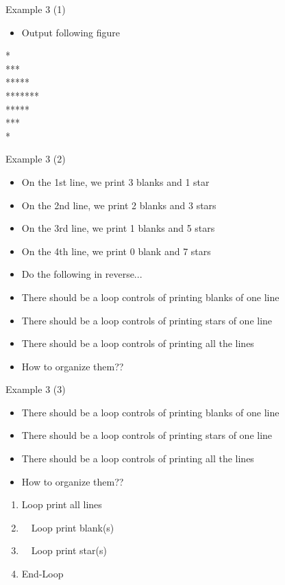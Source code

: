 \begin{frame}[fragile]{Example 3 (1)}
\begin{itemize}
	\item {Output following figure}
\end{itemize}
\begin{center}
\Large{
    * \\
   ***\\
  *****\\
 *******\\
  *****\\
   ***\\
    *
}
\end{center}
\end{frame}

\begin{frame}[fragile]{Example 3 (2)}
\begin{itemize}
	\item {On the 1st line, we print 3 blanks and 1 star}
    \item {On the 2nd line, we print 2 blanks and 3 stars}
    \item {On the 3rd line, we print 1 blanks and 5 stars}
    \item {On the 4th line, we print 0 blank  and 7 stars}
    \item {Do the following in reverse...}
\end{itemize}
\begin{itemize}
	\item {There should be a loop controls of printing blanks of one line}
    \item {There should be a loop controls of printing stars of one line}
    \item {There should be a loop controls of printing all the lines}
    \item {How to organize them??}
\end{itemize}

\end{frame}

\begin{frame}[fragile]{Example 3 (3)}
\begin{itemize}
	\item {There should be a loop controls of printing blanks of one line}
    \item {There should be a loop controls of printing stars of one line}
    \item {There should be a loop controls of printing all the lines}
    \item {How to organize them??}
\end{itemize}
\begin{enumerate}
	\item {Loop print all lines}
	\item {~~Loop print blank(s)}
	\item {~~Loop print star(s)}
	\item {End-Loop}
\end{enumerate}

\end{frame}

